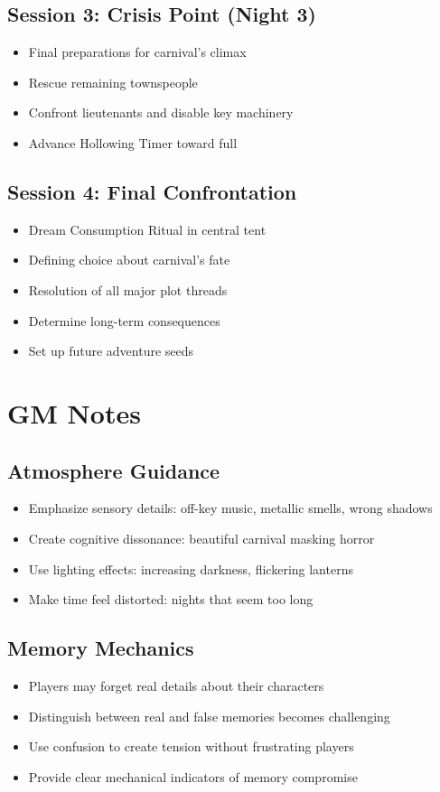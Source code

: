 \documentclass[11pt]{article}
\begin{document}
\subsection{Session 3: Crisis Point (Night 3)}
\begin{itemize}
\item Final preparations for carnival's climax
\item Rescue remaining townspeople
\item Confront lieutenants and disable key machinery
\item Advance Hollowing Timer toward full
\end{itemize}

\subsection{Session 4: Final Confrontation}
\begin{itemize}
\item Dream Consumption Ritual in central tent
\item Defining choice about carnival's fate
\item Resolution of all major plot threads
\item Determine long-term consequences
\item Set up future adventure seeds
\end{itemize}

\section{GM Notes}

\subsection{Atmosphere Guidance}
\begin{itemize}
\item Emphasize sensory details: off-key music, metallic smells, wrong shadows
\item Create cognitive dissonance: beautiful carnival masking horror
\item Use lighting effects: increasing darkness, flickering lanterns
\item Make time feel distorted: nights that seem too long
\end{itemize}

\subsection{Memory Mechanics}
\begin{itemize}
\item Players may forget real details about their characters
\item Distinguish between real and false memories becomes challenging
\item Use confusion to create tension without frustrating players
\item Provide clear mechanical indicators of memory compromise
\end{itemize}
\end{document}
